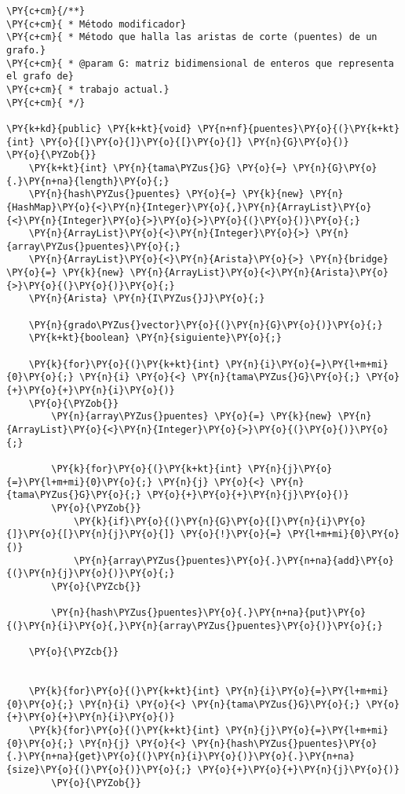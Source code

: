 \begin{Verbatim}[commandchars=\\\{\}]
\PY{c+cm}{/**}
\PY{c+cm}{ * Método modificador}
\PY{c+cm}{ * Método que halla las aristas de corte (puentes) de un grafo.}
\PY{c+cm}{ * @param G: matriz bidimensional de enteros que representa el grafo de}
\PY{c+cm}{ * trabajo actual.}
\PY{c+cm}{ */}

\PY{k+kd}{public} \PY{k+kt}{void} \PY{n+nf}{puentes}\PY{o}{(}\PY{k+kt}{int} \PY{o}{[}\PY{o}{]}\PY{o}{[}\PY{o}{]} \PY{n}{G}\PY{o}{)}
\PY{o}{\PYZob{}}
    \PY{k+kt}{int} \PY{n}{tama\PYZus{}G} \PY{o}{=} \PY{n}{G}\PY{o}{.}\PY{n+na}{length}\PY{o}{;}
    \PY{n}{hash\PYZus{}puentes} \PY{o}{=} \PY{k}{new} \PY{n}{HashMap}\PY{o}{<}\PY{n}{Integer}\PY{o}{,}\PY{n}{ArrayList}\PY{o}{<}\PY{n}{Integer}\PY{o}{>}\PY{o}{>}\PY{o}{(}\PY{o}{)}\PY{o}{;}
    \PY{n}{ArrayList}\PY{o}{<}\PY{n}{Integer}\PY{o}{>} \PY{n}{array\PYZus{}puentes}\PY{o}{;}
    \PY{n}{ArrayList}\PY{o}{<}\PY{n}{Arista}\PY{o}{>} \PY{n}{bridge} \PY{o}{=} \PY{k}{new} \PY{n}{ArrayList}\PY{o}{<}\PY{n}{Arista}\PY{o}{>}\PY{o}{(}\PY{o}{)}\PY{o}{;}
    \PY{n}{Arista} \PY{n}{I\PYZus{}J}\PY{o}{;}

    \PY{n}{grado\PYZus{}vector}\PY{o}{(}\PY{n}{G}\PY{o}{)}\PY{o}{;}
    \PY{k+kt}{boolean} \PY{n}{siguiente}\PY{o}{;}

    \PY{k}{for}\PY{o}{(}\PY{k+kt}{int} \PY{n}{i}\PY{o}{=}\PY{l+m+mi}{0}\PY{o}{;} \PY{n}{i} \PY{o}{<} \PY{n}{tama\PYZus{}G}\PY{o}{;} \PY{o}{+}\PY{o}{+}\PY{n}{i}\PY{o}{)}
	\PY{o}{\PYZob{}}
	    \PY{n}{array\PYZus{}puentes} \PY{o}{=} \PY{k}{new} \PY{n}{ArrayList}\PY{o}{<}\PY{n}{Integer}\PY{o}{>}\PY{o}{(}\PY{o}{)}\PY{o}{;}
		
	    \PY{k}{for}\PY{o}{(}\PY{k+kt}{int} \PY{n}{j}\PY{o}{=}\PY{l+m+mi}{0}\PY{o}{;} \PY{n}{j} \PY{o}{<} \PY{n}{tama\PYZus{}G}\PY{o}{;} \PY{o}{+}\PY{o}{+}\PY{n}{j}\PY{o}{)}
		\PY{o}{\PYZob{}}
		    \PY{k}{if}\PY{o}{(}\PY{n}{G}\PY{o}{[}\PY{n}{i}\PY{o}{]}\PY{o}{[}\PY{n}{j}\PY{o}{]} \PY{o}{!}\PY{o}{=} \PY{l+m+mi}{0}\PY{o}{)}
			\PY{n}{array\PYZus{}puentes}\PY{o}{.}\PY{n+na}{add}\PY{o}{(}\PY{n}{j}\PY{o}{)}\PY{o}{;}
		\PY{o}{\PYZcb{}}

	    \PY{n}{hash\PYZus{}puentes}\PY{o}{.}\PY{n+na}{put}\PY{o}{(}\PY{n}{i}\PY{o}{,}\PY{n}{array\PYZus{}puentes}\PY{o}{)}\PY{o}{;}

	\PY{o}{\PYZcb{}}
	
	
    \PY{k}{for}\PY{o}{(}\PY{k+kt}{int} \PY{n}{i}\PY{o}{=}\PY{l+m+mi}{0}\PY{o}{;} \PY{n}{i} \PY{o}{<} \PY{n}{tama\PYZus{}G}\PY{o}{;} \PY{o}{+}\PY{o}{+}\PY{n}{i}\PY{o}{)}
	\PY{k}{for}\PY{o}{(}\PY{k+kt}{int} \PY{n}{j}\PY{o}{=}\PY{l+m+mi}{0}\PY{o}{;} \PY{n}{j} \PY{o}{<} \PY{n}{hash\PYZus{}puentes}\PY{o}{.}\PY{n+na}{get}\PY{o}{(}\PY{n}{i}\PY{o}{)}\PY{o}{.}\PY{n+na}{size}\PY{o}{(}\PY{o}{)}\PY{o}{;} \PY{o}{+}\PY{o}{+}\PY{n}{j}\PY{o}{)}
	    \PY{o}{\PYZob{}}


\end{Verbatim}

